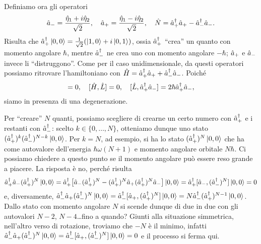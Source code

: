 Definiamo ora gli operatori
\begin{equation}
	\hat{a}_-=\frac{\hat{\eta}_1+i\hat{\eta}_2}{\sqrt{2}},\quad\hat{a}_+=\frac{\hat{\eta}_1-i\hat{\eta}_2}{\sqrt{2}},\quad\hat{N}={\hat{a}_+}^\dagger\hat{a}_+-{\hat{a}_-}^\dagger\hat{a}_-.
\end{equation}
Risulta che ${\hat{a}_+}^\dagger\left|{0,0}\right\rangle=\frac1{\sqrt{2}}(\left|{1,0}\right\rangle+i\left|{0,1}\right\rangle)$, ossia ${\hat{a}_+}^\dagger$ ``crea'' un quanto con momento angolare $\hbar$, mentre ${\hat{a}_-}^\dagger$ ne crea uno con momento angolare $-\hbar$; $\hat{a}_+$ e $\hat{a}_-$ invece li ``distruggono''.
Come per il caso unidimensionale, da questi operatori possiamo ritrovare l'hamiltoniano con $\hat{H}={\hat{a}_+}^\dagger\hat{a}_++{\hat{a}_-}^\dagger\hat{a}_-$.
Poich\'e
\begin{equation}
	[\op H,\adj{\op a_+}\op a_-]=0,\quad [\op H,\op L]=0,\quad [\op L,\adj{\op a_+}\op a_-]=2\hbar\adj{\op a_+}\op a_-,
\end{equation}
siamo in presenza di una degenerazione.

Per ``creare'' $N$ quanti, possiamo scegliere di crearne un certo numero con ${\hat{a}_+}^\dagger$ e i restanti con ${\hat{a}_-}^\dagger$: scelto $k\in\{0,\dots,N\}$, otteniamo dunque uno stato $({\hat{a}_+}^\dagger)^k({\hat{a}_-}^\dagger)^{N-k}\left|{0,0}\right\rangle$.
Per $k=N$, ad esempio, si ha lo stato $({\hat{a}_+}^\dagger)^N\left|{0,0}\right\rangle$ che ha come autovalore dell'energia $\hbar\omega(N+1)$ e momento angolare orbitale $N\hbar$.
Ci possiamo chiedere a questo punto se il momento angolare può essere reso grande a piacere.
La risposta è no, perch\'e risulta
\begin{equation}
	{\hat{a}_+}^\dagger\hat{a}_-({\hat{a}_+}^\dagger)^N\left|{0,0}\right\rangle={\hat{a}_+}^\dagger\big[\hat{a}_-({\hat{a}_+}^\dagger)^N-({\hat{a}_+}^\dagger)^N\hat{a}_+({\hat{a}_+}^\dagger)^N\hat{a}_-\big]\left|{0,0}\right\rangle={\hat{a}_+}^\dagger[\hat{a}_-,({\hat{a}_-}^\dagger)^N]\left|{0,0}\right\rangle=0
\end{equation}
e, diversamente, ${\hat{a}_-}^\dagger\hat{a}_+({\hat{a}_-}^\dagger)^N\left|{0,0}\right\rangle={\hat{a}_-}^\dagger[\hat{a}_+,({\hat{a}_+}^\dagger)^N]\left|{0,0}\right\rangle=N{\hat{a}_-}^\dagger({\hat{a}_+}^\dagger)^{N-1}\left|{0,0}\right\rangle$.
Dallo stato con momento angolare $N$ si scende dunque di due in due con gli autovalori $N-2$, $N-4$\dots fino a quando?
Giunti alla situazione simmetrica, nell'altro verso di rotazione, troviamo che $-N$ è il minimo, infatti ${\hat{a}_-}^\dagger\hat{a}_+({\hat{a}_-}^\dagger)^N\left|{0,0}\right\rangle={\hat{a}_-}^\dagger[\hat{a}_+,({\hat{a}_-}^\dagger)^N]\left|{0,0}\right\rangle=0$ e il processo si ferma qui.

